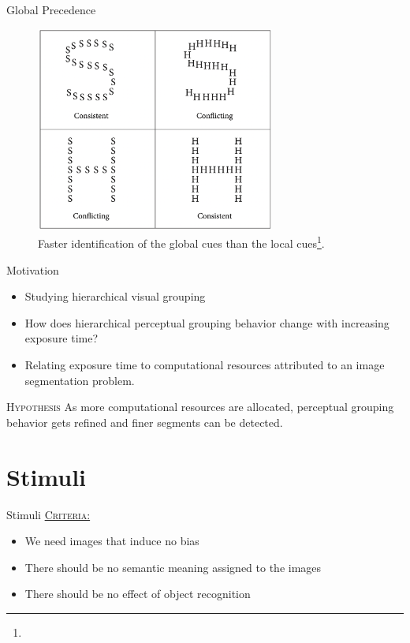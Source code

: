 \documentclass[10pt,xcolor=svgnames]{beamer} %
\begin{document}
\begin{frame}{Global Precedence}
    \begin{figure}
        \centering
        \includegraphics[width=0.7\textwidth]{pictures/globalPrecedence.png}
        \caption{Faster identification of the global cues than the local cues\footnote{}.}
        \label{fig:GlboalPrecedence}
    \end{figure}
\end{frame}


\begin{frame}{Motivation}
\begin{itemize}
    \item Studying hierarchical visual grouping
    \pause
    \item How does hierarchical perceptual grouping behavior change with increasing exposure time?
    \pause
    \item Relating exposure time to computational resources attributed to an image segmentation problem.
    \pause
\end{itemize}
    
\begin{exampleblock}{\textsc{Hypothesis}}
As more computational resources are allocated, perceptual grouping behavior gets refined and finer segments can be detected.
\end{exampleblock}

\end{frame}
\section{Stimuli}
\begin{frame}{Stimuli}
    \underline{\textsc{Criteria:}}
    \begin{itemize}
        \item We need images that induce no bias
        \item There should be no semantic meaning assigned to the images
        \item There should be no effect of object recognition
    \end{itemize}
\end{frame}
\end{document}
